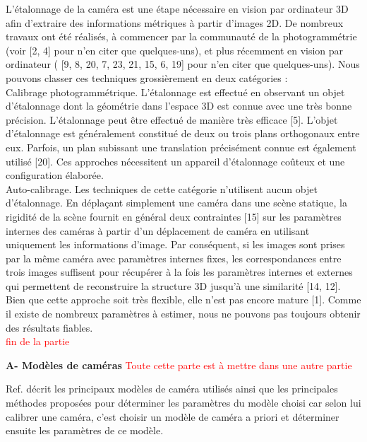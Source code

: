 \documentclass[12pt,a4paper]{report}
\begin{document}
L'étalonnage de la caméra est une étape nécessaire en vision par ordinateur 3D afin d'extraire des informations métriques à partir d'images 2D. De nombreux travaux ont été réalisés, à commencer par la communauté de la photogrammétrie (voir [2, 4] pour n'en citer que quelques-uns), et plus récemment en vision par ordinateur ( [9, 8, 20, 7, 23, 21, 15, 6, 19] pour n'en citer que quelques-uns). Nous pouvons classer ces techniques grossièrement en deux catégories : \\
Calibrage photogrammétrique. L'étalonnage est effectué en observant un objet d'étalonnage dont la géométrie dans l'espace 3D est connue avec une très bonne précision. L'étalonnage peut être effectué de manière très efficace [5]. L'objet d'étalonnage est généralement constitué de deux ou trois plans orthogonaux entre eux. Parfois, un plan subissant une translation précisément connue est également utilisé [20]. Ces approches nécessitent un appareil d'étalonnage coûteux et une configuration élaborée.\\
Auto-calibrage. Les techniques de cette catégorie n’utilisent aucun objet d’étalonnage. En déplaçant simplement une caméra dans une scène statique, la rigidité de la scène fournit en général deux contraintes [15] sur les paramètres internes des caméras à partir d'un déplacement de caméra en utilisant uniquement les informations d'image. Par conséquent, si les images sont prises par la même caméra avec paramètres internes fixes, les correspondances entre trois images suffisent pour récupérer à la fois les paramètres internes et externes qui permettent de reconstruire la structure 3D jusqu'à une similarité [14, 12]. Bien que cette approche soit très flexible, elle n’est pas encore mature [1]. Comme il existe de nombreux paramètres à estimer, nous ne pouvons pas toujours obtenir des résultats fiables.\\
 \textcolor{red}{fin de la partie}\\
 


\begin{center}
\textbf{A- Modèles de caméras} \textcolor{red}{Toute cette parte est à mettre dans une autre partie}
\end{center}

Ref.\cite{orteu_calibrage_nodate} décrit les principaux modèles de caméra utilisés ainsi que les principales méthodes proposées pour déterminer les paramètres du modèle choisi car selon lui calibrer une caméra, c'est choisir un modèle de caméra a priori et déterminer ensuite les paramètres de ce modèle.\\
\end{document}
